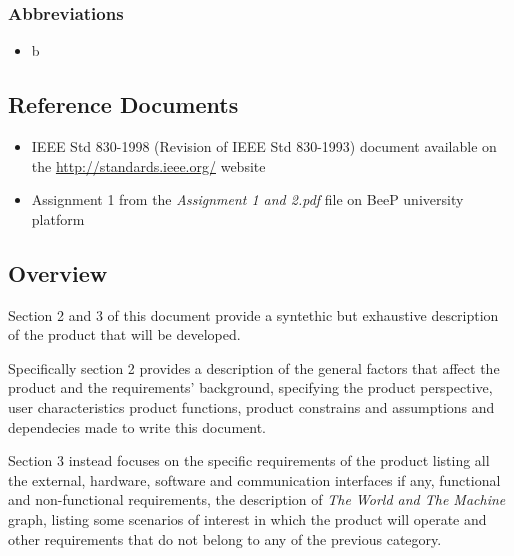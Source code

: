 		\subsubsection{Abbreviations}
		\begin{itemize}
			\item b
		\end{itemize}
	\subsection{Reference Documents}
	\begin{itemize}
		\item IEEE Std 830-1998 (Revision of IEEE Std 830-1993) document available on the \url{http://standards.ieee.org/} website
		\item Assignment 1 from the \emph{Assignment 1 and 2.pdf} file on BeeP university platform
	\end{itemize}
	\subsection{Overview}
		Section 2 and 3 of this document provide a syntethic but exhaustive description of the product that will be developed.
				
		Specifically section 2 provides a description of the general factors that affect the product and the requirements' background, specifying the product perspective, user characteristics product functions, product constrains and assumptions and dependecies made to write this document.
		
		Section 3 instead focuses on the specific requirements of the product listing all the external, hardware, software and communication interfaces if any, functional and non-functional requirements, the description of \emph{The World and The Machine} graph, listing some scenarios of interest in which the product will operate and other requirements that do not belong to any of the previous category. 
	
	